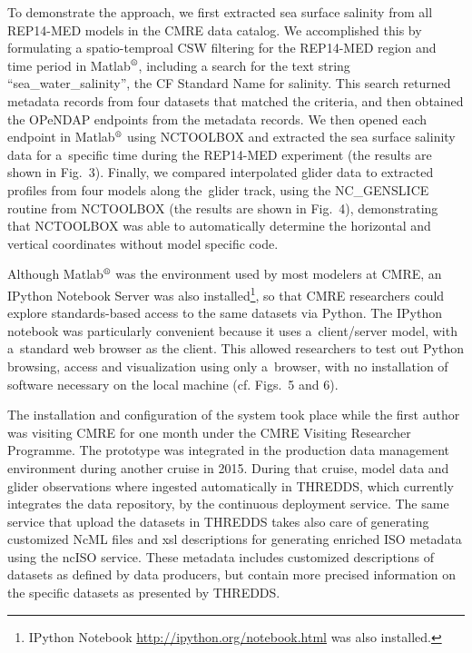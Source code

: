 \documentclass[osd, online, hvmath]{copernicus}
\begin{document}
To demonstrate the approach, we first extracted sea surface salinity from all REP14-MED models in the CMRE data catalog. We accomplished this by 
formulating a spatio-temproal CSW filtering for the REP14-MED region and time period in Matlab$^{\text{\textregistered}}$, including a search for the text
string ``sea\_water\_salinity'', the CF Standard Name for salinity. This search returned metadata records from four datasets that matched the criteria, and then obtained the OPeNDAP endpoints from the metadata records. 
We then opened each endpoint in Matlab$^{\text{\textregistered}}$ using NCTOOLBOX and extracted the sea surface salinity data for a~specific time during the REP14-MED
experiment (the results are shown in Fig.~3). Finally, we compared interpolated glider data to extracted profiles from four models along the~glider track, using
the NC\_GENSLICE routine from NCTOOLBOX (the results are shown in Fig.~4), demonstrating that NCTOOLBOX was able to automatically
determine the horizontal and vertical coordinates without model specific code.

Although Matlab$^{\text{\textregistered}}$ was the environment used by
most modelers at CMRE, an IPython Notebook Server was also installed\footnote{IPython
  Notebook \url{http://ipython.org/notebook.html} was also
  installed.}, so that CMRE researchers could explore standards-based
access to the same datasets via Python. The IPython notebook was
particularly convenient because it uses a~client/server model, with
a~standard web browser as the client. This allowed researchers to test
out Python browsing, access and visualization using only a~browser,
with no installation of software necessary on the local machine
(cf. Figs.~5 and 6). %

The installation and configuration of the system took place while the first author was visiting CMRE for one month under the CMRE Visiting
Researcher Programme. The prototype was integrated in the production data management environment during another cruise in 2015. During that cruise, model data and glider observations where ingested automatically in THREDDS, which currently integrates the data repository, by the continuous deployment service. The same service that upload the datasets in THREDDS takes also care of generating customized NcML files and xsl descriptions for generating enriched ISO metadata using the ncISO service. These metadata includes customized descriptions of datasets as defined by data producers, but contain more precised information on the specific datasets as presented by THREDDS. 
\end{document}
